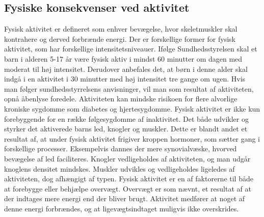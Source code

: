 \subsection{Fysiske konsekvenser ved aktivitet}
Fysisk aktivitet er defineret som enhver bevægelse, hvor skeletmuskler skal kontrahere og derved forbrænde energi. Der er forskellige former for fysisk aktivitet, som har forskellige intensitetsniveauer. \citep{Academic2016a} Ifølge Sundhedsstyrelsen skal et barn i alderen 5-17 år være fysisk aktiv i mindst 60 minutter om dagen med moderat til høj intensitet. Derudover anbefales det, at børn i denne alder skal indgå i en aktivitet i 30 minutter med høj intensitet tre gange om ugen. \citep{Sundhedsstyrelsen2016} Hvis man følger sundhedsstyrrelsens anvisninger, vil man som resultat af aktiviteten, opnå åbenlyse foredele. Aktiviteten kan mindske risikoen for flere alvorlige kroniske sygdomme som diabetes og hjertesygdomme. Fysisk aktivitet er ikke kun forebyggende for en række følgesygdomme af inaktivitet. Det både udvikler og styrker det aktiverede barns led, knogler og muskler. Dette er blandt andet et resultat af, at under fysisk aktivitet frigiver kroppen hormoner, som sætter gang i forskellige processer. Eksempelvis dannes der mere synovialvæske, hvorved bevægelse af led faciliteres. Knogler vedligeholdes af aktiviteten, og man udgår knoglens densitet mindskes. Muskler udvikles og vedligeholdes ligeledes af aktiviteten, dog afhængigt af typen. Fysisk aktivitet er en af faktorerne til både at forebygge eller behjælpe overvægt. Overvægt er som nævnt, et resultat af at der indtages mere energi end der bliver brugt. Aktivitet medfører at noget af denne energi forbrændes, og at ligevægtsindtaget muligvis ikke overskrides. \citep{Academic2016a,Smith1991,Academic2016b,Cotman2007,CenterforDiseaseControlandPrevention2015}

